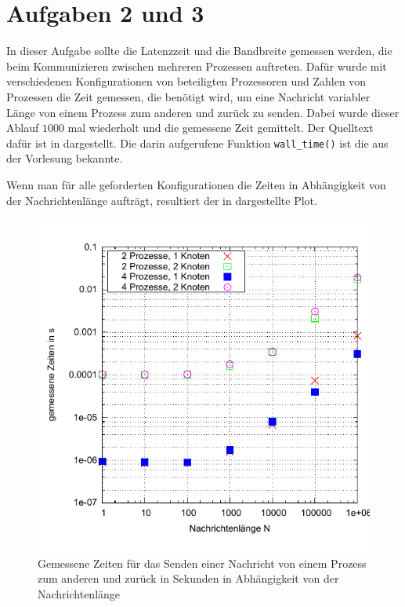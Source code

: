 \section*{Aufgaben 2 und 3}
In dieser Aufgabe sollte die Latenzzeit und die Bandbreite gemessen werden, die
beim Kommunizieren zwischen mehreren Prozessen auftreten. Dafür wurde mit verschiedenen
Konfigurationen von beteiligten Prozessoren und Zahlen von Prozessen die Zeit gemessen,
die benötigt wird, um eine Nachricht variabler Länge von einem Prozess zum anderen
und zurück zu senden. Dabei wurde dieser Ablauf $1000$ mal wiederholt und die 
gemessene Zeit gemittelt. Der Quelltext dafür ist in  dargestellt.
Die darin aufgerufene Funktion \texttt{wall\_time()} ist die aus der Vorlesung bekannte.


% 

Wenn man für alle geforderten Konfigurationen die Zeiten in Abhängigkeit von der
Nachrichtenlänge aufträgt, resultiert der in  dargestellte Plot.

\begin{figure}[htb]
  \centering
  \includegraphics[width=0.8\columnwidth,keepaspectratio]{../tmp/zeiten}
  \caption{Gemessene Zeiten für das Senden einer Nachricht von einem Prozess zum
  anderen und zurück in Sekunden in Abhängigkeit von der Nachrichtenlänge}
  \label{fig:zeiten}
\end{figure}

